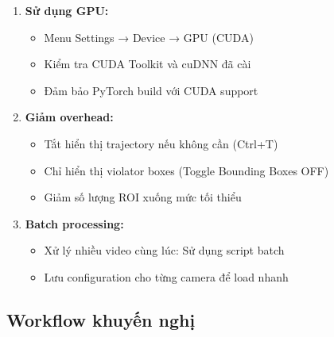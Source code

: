 \begin{enumerate}
    \item \textbf{Sử dụng GPU:}
    \begin{itemize}
        \item Menu Settings → Device → GPU (CUDA)
        \item Kiểm tra CUDA Toolkit và cuDNN đã cài
        \item Đảm bảo PyTorch build với CUDA support
    \end{itemize}

    \item \textbf{Giảm overhead:}
    \begin{itemize}
        \item Tắt hiển thị trajectory nếu không cần (Ctrl+T)
        \item Chỉ hiển thị violator boxes (Toggle Bounding Boxes OFF)
        \item Giảm số lượng ROI xuống mức tối thiểu
    \end{itemize}

    \item \textbf{Batch processing:}
    \begin{itemize}
        \item Xử lý nhiều video cùng lúc: Sử dụng script batch
        \item Lưu configuration cho từng camera để load nhanh
    \end{itemize}
\end{enumerate}

\subsection{Workflow khuyến nghị}

